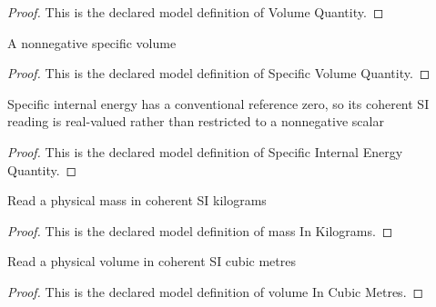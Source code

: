 \begin{proof}
  This is the declared model definition of Volume Quantity.
\end{proof}
\begin{definition}
  \label{def:physics:phyx-mini-0464:phyxminiproblems-problemphyxmini0464-specificvolumequantity}
  A nonnegative specific volume
\end{definition}
\begin{proof}
  This is the declared model definition of Specific Volume Quantity.
\end{proof}
\begin{definition}
  \label{def:physics:phyx-mini-0464:phyxminiproblems-problemphyxmini0464-specificinternalenergyquantity}
  Specific internal energy has a conventional reference zero, so its coherent SI reading is real-valued rather than restricted to a nonnegative scalar
\end{definition}
\begin{proof}
  This is the declared model definition of Specific Internal Energy Quantity.
\end{proof}
\begin{definition}
  \label{def:physics:phyx-mini-0464:phyxminiproblems-problemphyxmini0464-massinkilograms}
  Read a physical mass in coherent SI kilograms
\end{definition}
\begin{proof}
  This is the declared model definition of mass In Kilograms.
\end{proof}
\begin{definition}
  \label{def:physics:phyx-mini-0464:phyxminiproblems-problemphyxmini0464-volumeincubicmetres}
  Read a physical volume in coherent SI cubic metres
\end{definition}
\begin{proof}
  This is the declared model definition of volume In Cubic Metres.
\end{proof}
